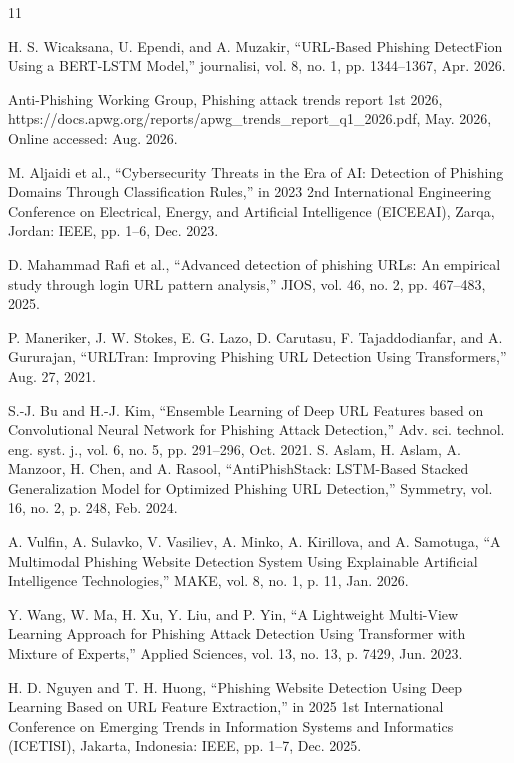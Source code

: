 \documentclass[conference]{IEEEtran}
\begin{document}
\begin{thebibliography}{11}


H. S. Wicaksana, U. Ependi, and A. Muzakir, “URL-Based Phishing DetectFion Using a BERT-LSTM Model,” journalisi, vol. 8, no. 1, pp. 1344–1367, Apr. 2026.

Anti-Phishing Working Group, Phishing attack trends report 1st 2026, https://docs.apwg.org/reports/apwg\_trends\_report\_q1\_2026.pdf, May. 2026, Online accessed:  Aug. 2026.

M. Aljaidi et al., “Cybersecurity Threats in the Era of AI: Detection of Phishing Domains Through Classification Rules,” in 2023 2nd International Engineering Conference on Electrical, Energy, and Artificial Intelligence (EICEEAI), Zarqa, Jordan: IEEE, pp. 1–6, Dec. 2023.

D. Mahammad Rafi et al., “Advanced detection of phishing URLs: An empirical study through login URL pattern analysis,” JIOS, vol. 46, no. 2, pp. 467–483, 2025.


P. Maneriker, J. W. Stokes, E. G. Lazo, D. Carutasu, F. Tajaddodianfar, and A. Gururajan, “URLTran: Improving Phishing URL Detection Using Transformers,” Aug. 27, 2021.

S.-J. Bu and H.-J. Kim, “Ensemble Learning of Deep URL Features based on Convolutional Neural Network for Phishing Attack Detection,” Adv. sci. technol. eng. syst. j., vol. 6, no. 5, pp. 291–296, Oct. 2021.
S. Aslam, H. Aslam, A. Manzoor, H. Chen, and A. Rasool, “AntiPhishStack: LSTM-Based Stacked Generalization Model for Optimized Phishing URL Detection,” Symmetry, vol. 16, no. 2, p. 248, Feb. 2024.

A. Vulfin, A. Sulavko, V. Vasiliev, A. Minko, A. Kirillova, and A. Samotuga, “A Multimodal Phishing Website Detection System Using Explainable Artificial Intelligence Technologies,” MAKE, vol. 8, no. 1, p. 11, Jan. 2026.

Y. Wang, W. Ma, H. Xu, Y. Liu, and P. Yin, “A Lightweight Multi-View Learning Approach for Phishing Attack Detection Using Transformer with Mixture of Experts,” Applied Sciences, vol. 13, no. 13, p. 7429, Jun. 2023.

H. D. Nguyen and T. H. Huong, “Phishing Website Detection Using Deep Learning Based on URL Feature Extraction,” in 2025 1st International Conference on Emerging Trends in Information Systems and Informatics (ICETISI), Jakarta, Indonesia: IEEE, pp. 1–7, Dec. 2025.


\end{thebibliography}
\end{document}
